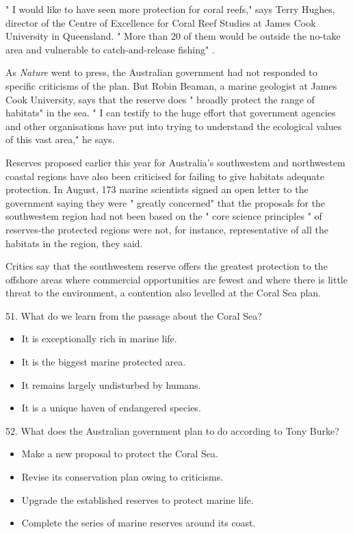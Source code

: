\documentclass[UTF8,11pt]{ctexart}
\begin{document}
" I would like to have seen more protection for coral reefs," says Terry Hughes, director of the Centre of Excellence for Coral Reef Studies at James Cook University in Queensland. " More than 20 of them would be outside the no-take area and vulnerable to catch-and-release fishing" .


As \textit{Nature }went to press, the Australian government had not responded to specific criticisms of the plan. But Robin Beaman, a marine geologist at James Cook University, says that the reserve does " broadly protect the range of habitats" in the sea. " I can testify to the huge effort that government agencies and other organisations have put into trying to understand the ecological values of this vast area," he says.


Reserves proposed earlier this year for Australia's southwestem and northwestem coastal regions have also been criticised for failing to give habitats adequate protection. In August, 173 marine scientists signed an open letter to the government saying they were " greatly concerned" that the proposals for the southwestem region had not been based on the " core science principles " of reserves-the protected regions were not, for instance, representative of all the habitats in the region, they said.


Critics say that the southwestem reserve offers the greatest protection to the offshore areas where commercial opportunities are fewest and where there is little threat to the environment, a contention also levelled at the Coral Sea plan.


51. What do we learn from the passage about the Coral Sea?


\begin{itemize}[leftmargin=2em,itemsep=.2em,topsep=.4em]\item[A.] It is exceptionally rich in marine life.
\item[B.] It is the biggest marine protected area.
\item[C.] It remains largely undisturbed by humans.
\item[D.] It is a unique haven of endangered species.
\end{itemize}

52. What does the Australian government plan to do according to Tony Burke?


\begin{itemize}[leftmargin=2em,itemsep=.2em,topsep=.4em]\item[A.] Make a new proposal to protect the Coral Sea.
\item[B.] Revise its conservation plan owing to criticisms.
\item[C.] Upgrade the established reserves to protect marine life.
\item[D.] Complete the series of marine reserves around its coast.
\end{itemize}
\end{document}
